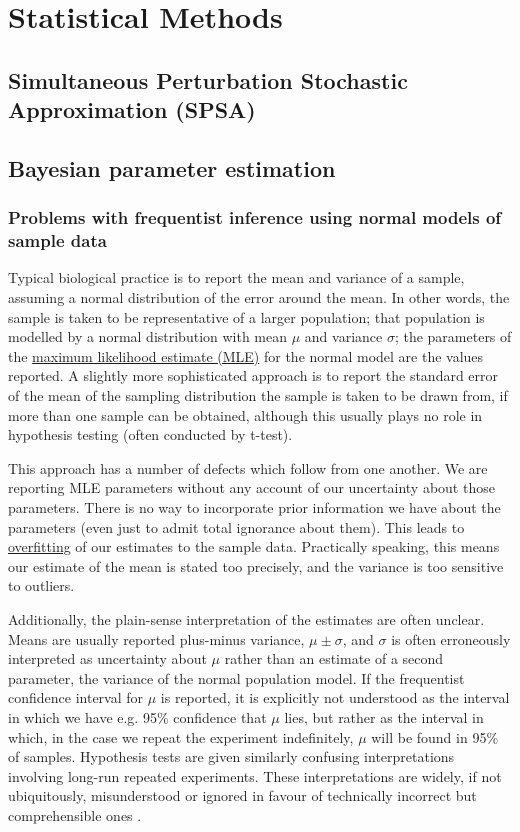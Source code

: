 \section{Statistical Methods}
\subsection{Simultaneous Perturbation Stochastic Approximation (SPSA)}

\subsection{Bayesian parameter estimation}
\label{ssec:Bayes}
\subsubsection{Problems with frequentist inference using normal models of sample data}
Typical biological practice is to report the mean and variance of a sample, assuming a normal distribution of the error around the mean. In other words, the sample is taken to be representative of a larger population; that population is modelled by a normal distribution with mean $\mu$ and variance $\sigma$; the parameters of the \hyperref[MLE]{maximum likelihood estimate (MLE)} for the normal model are the values reported. A slightly more sophisticated approach is to report the standard error of the mean of the sampling distribution the sample is taken to be drawn from, if more than one sample can be obtained, although this usually plays no role in hypothesis testing (often conducted by t-test).

This approach has a number of defects which follow from one another. We are reporting MLE parameters without any account of our uncertainty about those parameters. There is no way to incorporate prior information we have about the parameters (even just to admit total ignorance about them). This leads to \hyperref[ssec:overfit]{overfitting} of our estimates to the sample data. Practically speaking, this means our estimate of the mean is stated too precisely, and the variance is too sensitive to outliers.

Additionally, the plain-sense interpretation of the estimates are often unclear. Means are usually reported plus-minus variance, $\mu\pm\sigma$, and $\sigma$ is often erroneously interpreted as uncertainty about $\mu$ rather than an estimate of a second parameter, the variance of the normal population model. If the frequentist confidence interval for $\mu$ is reported, it is explicitly not understood as the interval in which we have e.g. 95$\%$ confidence that $\mu$ lies, but rather as the interval in which, in the case we repeat the experiment indefinitely, $\mu$ will be found in 95$\%$ of samples. Hypothesis tests are given similarly confusing interpretations involving long-run repeated experiments. These interpretations are widely, if not ubiquitously, misunderstood or ignored in favour of technically incorrect but comprehensible ones \cite{Hoekstra2014, Greenland2016}.


